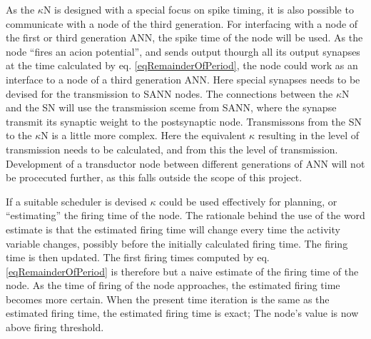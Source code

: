 	As the $\kappa$N is designed with a special focus on spike timing, it is also possible to communicate with a node of the third generation.
	For interfacing with a node of the first or third generation ANN, the spike time of the node will be used. %
	As the node ``fires an acion potential'', and sends output thourgh all its output synapses at the time calculated by eq. \eqref{eqRemainderOfPeriod}, the node could work as an interface to a node of a third generation ANN. 
	Here special synapses needs to be devised for the transmission to SANN nodes. 
	The connections between the $\kappa$N and the SN will use the transmission sceme from SANN, where the synapse transmit its synaptic weight to the postsynaptic node. 
	Transmissons from the SN to  the $\kappa$N is a little more complex. Here the equivalent $\kappa$ resulting in the level of transmission needs to be calculated, and from this the level of transmission.
	Development of a transductor node between different generations of ANN will not be procecuted further, as this falls outside the scope of this project.

	
	If a suitable scheduler is devised $\kappa$ could be used effectively for planning, or ``estimating'' the firing time of the node.
	The rationale behind the use of the word estimate is that the estimated firing time will change every time the activity variable changes, possibly before the initially calculated firing time. 
	The firing time is then updated. 
	The first firing times computed by eq. \eqref{eqRemainderOfPeriod} is therefore but a naive estimate of the firing time of the node.
	As the time of firing of the node approaches, the estimated firing time becomes more certain.
	When the present time iteration is the same as the estimated firing time, the estimated firing time is exact; The node's value is now above firing threshold.
	
